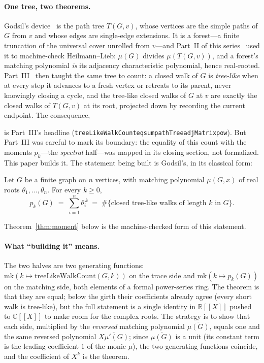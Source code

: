 \documentclass[11pt]{article}
\newcommand{\lean}[1]{{\def\_{\textunderscore\allowbreak}\texttt{#1}}}
\newcommand{\R}{\mathbb{R}}
\newcommand{\C}{\mathbb{C}}
\providecommand{\llbracket}{[\![}
\providecommand{\rrbracket}{]\!]}
\newcommand{\keyeq}[1]{\begin{center}\keybox{$\displaystyle #1$}\end{center}}
\begin{document}
\paragraph{One tree, two theorems.} Godsil's device~\cite{Godsil1981a,Godsil1981b,GodsilBook}
is the path tree $T(G,v)$, whose vertices are the simple paths of $G$ from $v$ and whose edges are
single-edge extensions. It is a forest---a finite truncation of the universal cover unrolled from
$v$---and Part~II of this series~\cite{PartII} used it to machine-check Heilmann--Lieb: $\mu(G)$
divides $\mu(T(G,v))$, and a forest's matching polynomial \emph{is} its adjacency characteristic
polynomial, hence real-rooted. Part~III~\cite{PartIII} then taught the same tree to count: a closed
walk of $G$ is \emph{tree-like} when at every step it advances to a fresh vertex or retreats to its
parent, never knowingly closing a cycle, and the tree-like closed walks of $G$ at $v$ are exactly the
closed walks of $T(G,v)$ at its root, projected down by recording the current endpoint. The
consequence,
\keyeq{\mathrm{treeLikeWalkCount}(G,k)\;=\;\sum_{v}\bigl[A(T(G,v))^{k}\bigr]_{\mathrm{root}},}
is Part~III's headline (\lean{treeLikeWalkCount\_eq\_sum\_pathTree\_adjMatrix\_pow}). But Part~III was
careful to mark its boundary: the equality of this count with the moments $p_k$---the \emph{spectral}
half---was mapped in its closing section, not formalized. This paper builds it. The statement being
built is Godsil's, in its classical form:

\begin{classicalbox}
Let $G$ be a finite graph on $n$ vertices, with matching polynomial $\mu(G,x)$ of real roots
$\theta_1,\dots,\theta_n$. For every $k\ge0$,
\[
  p_k(G)\;=\;\sum_{i=1}^{n}\theta_i^{\,k}\;=\;\#\{\text{closed tree-like walks of length }k\text{ in }G\}.
\]
\end{classicalbox}
\noindent Theorem~\ref{thm:moment} below is the machine-checked form of this statement.

\paragraph{What ``building it'' means.} The two halves are two generating functions:
$\mathrm{mk}(k\mapsto\mathrm{treeLikeWalkCount}(G,k))$ on the trace side and $\mathrm{mk}(k\mapsto
p_k(G))$ on the matching side, both elements of a formal power-series ring. The theorem is that they
are equal; below the girth their coefficients already agree (every short walk is tree-like), but the
full statement is a single identity in $\R\llbracket X\rrbracket$ pushed to $\C\llbracket X\rrbracket$
to make room for the complex roots. The strategy is to show that each side, multiplied by the
\emph{reversed} matching polynomial $\overline{\mu(G)}$, equals one and the same reversed polynomial
$\overline{X\mu'(G)}$; since $\overline{\mu(G)}$ is a unit (its constant term is the leading
coefficient $1$ of the monic $\mu$), the two generating functions coincide, and the coefficient of
$X^k$ is the theorem.
\end{document}
